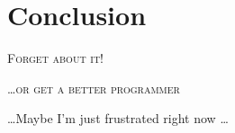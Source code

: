 \documentclass[letterpaper,twocolumn,amsmath,amssymb,prb]{revtex4-1}
\begin{document}



\section{Conclusion}

\textsc{Forget about it!}

\ldots\textsc{or get a better programmer}

\ldots Maybe I'm just frustrated right now \ldots


\end{document}
